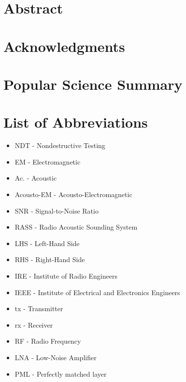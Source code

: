 \documentclass[10pt,a4paper]{eitExjobb}
\begin{document}
	
	
	\MakeTitlePage  %
	
	\frontmatter    %
	
	\chapter*{Abstract}
	
	\chapter*{Acknowledgments}
	
	\chapter*{Popular Science Summary}
	\tableofcontents
	\listoffigures
	\listoftables
	\chapter*{List of Abbreviations}
	\begin{itemize}
		\item NDT - Nondestructive Testing
		\item EM - Electromagnetic
		\item Ac. - Acoustic
		\item Acousto-EM - Acousto-Electromagnetic
		\item SNR - Signal-to-Noise Ratio
		\item RASS - Radio Acoustic Sounding System
		\item LHS - Left-Hand Side
		\item RHS - Right-Hand Side
		\item IRE - Institute of Radio Engineers
		\item IEEE - Institute of Electrical and Electronics Engineers
		\item tx - Transmitter
		\item rx - Receiver
		\item RF - Radio Frequency
		\item LNA - Low-Noise Amplifier
		\item PML - Perfectly matched layer
	\end{itemize}
	
\end{document}
